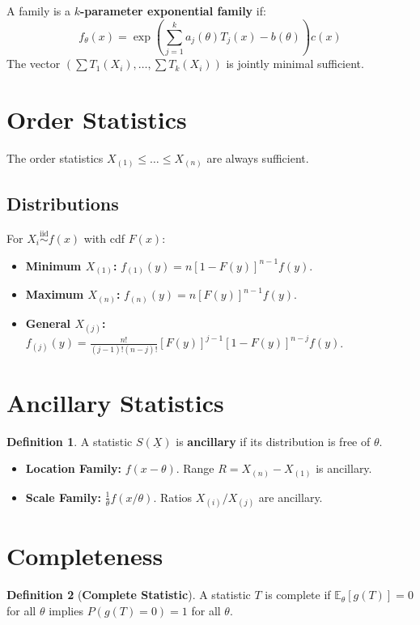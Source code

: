 \documentclass[12pt, a4paper]{article}
\theoremstyle{definition}
\newtheorem{definition}{Definition}
\newcommand{\E}{\mathbb{E}}
\newcommand{\iid}{\overset{\text{iid}}{\sim}}
\newcommand{\Xvec}{\underline{X}}
\begin{document}
A family is a \textbf{$k$-parameter exponential family} if:
$$ f_\theta(x) = \exp\left( \sum_{j=1}^k a_j(\theta)T_j(x) - b(\theta) \right) c(x) $$
The vector $(\sum T_1(X_i), \dots, \sum T_k(X_i))$ is jointly minimal sufficient.

\section{Order Statistics}
The order statistics $X_{(1)} \le \dots \le X_{(n)}$ are always sufficient.
\subsection{Distributions}
For $X_i \iid f(x)$ with cdf $F(x)$:
\begin{itemize}
    \item \textbf{Minimum $X_{(1)}$:} $f_{(1)}(y) = n[1 - F(y)]^{n-1} f(y)$.
    \item \textbf{Maximum $X_{(n)}$:} $f_{(n)}(y) = n[F(y)]^{n-1} f(y)$.
    \item \textbf{General $X_{(j)}$:} $f_{(j)}(y) = \frac{n!}{(j-1)!(n-j)!} [F(y)]^{j-1} [1 - F(y)]^{n-j} f(y)$.
\end{itemize}

\section{Ancillary Statistics}
\begin{definition}
A statistic $S(\Xvec)$ is \textbf{ancillary} if its distribution is free of $\theta$.
\end{definition}
\begin{itemize}
    \item \textbf{Location Family:} $f(x-\theta)$. Range $R = X_{(n)} - X_{(1)}$ is ancillary.
    \item \textbf{Scale Family:} $\frac{1}{\theta} f(x/\theta)$. Ratios $X_{(i)}/X_{(j)}$ are ancillary.
\end{itemize}

\section{Completeness}
\begin{definition}[\textbf{Complete Statistic}]
A statistic $T$ is complete if $\E_\theta[g(T)] = 0$ for all $\theta$ implies $P(g(T)=0) = 1$ for all $\theta$.
\end{definition}
\end{document}
